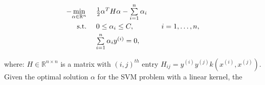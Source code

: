 \begin{equation}
\label{eq:svm_dual}
\begin{array}{rll}
-\underset{\alpha \in \mathbb{R}^n}{\min}~ & \frac{1}{2} \alpha^T H \alpha - \sum\limits_{i = 1}^n \alpha_i \vspace{3pt}\\
\textup{s.t.}~ & 0 \leq \alpha_i \leq C,&~~~i=1,\ldots ,n, \vspace{3pt}\\
& \sum\limits_{i = 1}^n \alpha_i y^{(i)} = 0, & \vspace{5pt}\\
\end{array}
\end{equation}
where:  $H \in \mathbb{R}^{n \times n}$ is a matrix with $(i,j)^{th}$ entry $H_{ij} = y^{(i)} y^{(j)} k(x^{(i)}, x^{(j)})$.\\

Given the optimal solution $\alpha$ for the SVM problem with a linear kernel, the 